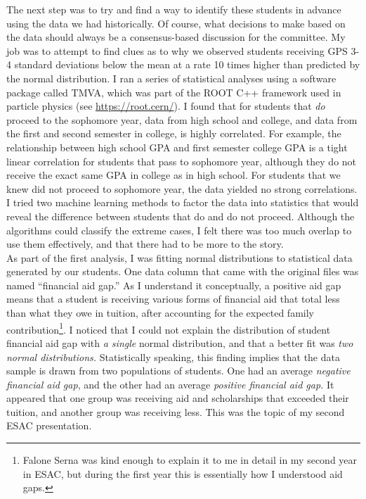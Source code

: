 \documentclass[../../../main.tex]{subfiles}
\begin{document}
The next step was to try and find a way to identify these students in advance using the data we had historically.  Of course, what decisions to make based on the data should always be a consensus-based discussion for the committee.  My job was to attempt to find clues as to why we observed students receiving GPS 3-4 standard deviations below the mean at a rate 10 times higher than predicted by the normal distribution.  I ran a series of statistical analyses using a software package called TMVA, which was part of the ROOT C++ framework used in particle physics (see \url{https://root.cern/}).  I found that for students that \textit{do} proceed to the sophomore year, data from high school and college, and data from the first and second semester in college, is highly correlated.  For example, the relationship between high school GPA and first semester college GPA is a tight linear correlation for students that pass to sophomore year, although they do not receive the exact same GPA in college as in high school.  For students that we knew did not proceed to sophomore year, the data yielded no strong correlations.  I tried two machine learning methods to factor the data into statistics that would reveal the difference between students that do and do not proceed.  Although the algorithms could classify the extreme cases, I felt there was too much overlap to use them effectively, and that there had to be more to the story.
\\
\vspace{0.25cm}
As part of the first analysis, I was fitting normal distributions to statistical data generated by our students.  One data column that came with the original files was named ``financial aid gap.''  As I understand it conceptually, a positive aid gap means that a student is receiving various forms of financial aid that total less than what they owe in tuition, after accounting for the expected family contribution\footnote{Falone Serna was kind enough to explain it to me in detail in my second year in ESAC, but during the first year this is essentially how I understood aid gaps.}.  I noticed that I could not explain the distribution of student financial aid gap with \textit{a single} normal distribution, and that a better fit was \textit{two normal distributions.}  Statistically speaking, this finding implies that the data sample is drawn from two populations of students.  One had an average \textit{negative financial aid gap}, and the other had an average \textit{positive financial aid gap.}  It appeared that one group was receiving aid and scholarships that exceeded their tuition, and another group was receiving less.  This was the topic of my second ESAC presentation.
\\
\vspace{0.25cm}
\end{document}
